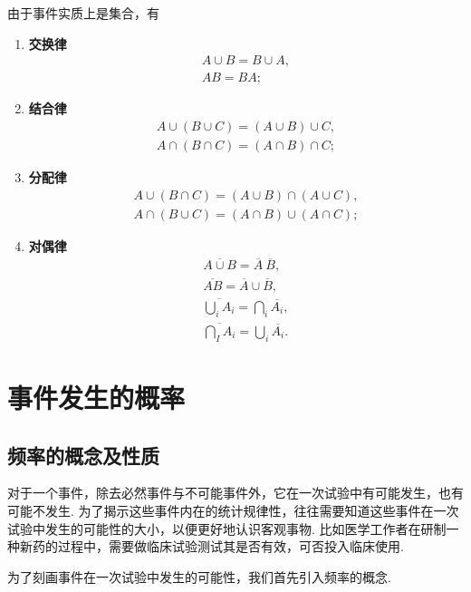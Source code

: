 \begin{theorem}[事件的运算规律]
由于事件实质上是集合，有
\begin{enumerate}
	\item {\bf 交换律}
	\begin{gather}
		A \cup B = B \cup A, \\
		A B = B A;
	\end{gather}

	\item {\bf 结合律}
	\begin{gather}
		A \cup (B \cup C) = (A \cup B) \cup C, \\
		A \cap (B \cap C) = (A \cap B) \cap C;
	\end{gather}

	\item {\bf 分配律}
	\begin{gather}
		A \cup (B \cap C) = (A \cup B) \cap (A \cup C), \\
		A \cap (B \cup C) = (A \cap B) \cup (A \cap C);
	\end{gather}

	\item {\bf 对偶律}
	\begin{gather}
		\overline{A \cup B} = \overline{A}\ \overline{B}, \\
		\overline{AB} = \overline{A} \cup \overline{B}, \\
		\overline{\bigcup_{i}{A_i}} = \bigcap_{i}{\overline{A_i}}, \\
		\overline{\bigcap_{I}{A_i}} = \bigcup_{i}{\overline{A_i}}.
	\end{gather}
\end{enumerate}
\end{theorem}

\section{事件发生的概率}

\subsection{频率的概念及性质}
对于一个事件，除去必然事件与不可能事件外，它在一次试验中有可能发生，也有可能不发生.
为了揭示这些事件内在的统计规律性，往往需要知道这些事件在一次试验中发生的可能性的大小，以便更好地认识客观事物.
比如医学工作者在研制一种新药的过程中，需要做临床试验测试其是否有效，可否投入临床使用.

为了刻画事件在一次试验中发生的可能性，我们首先引入频率的概念.

